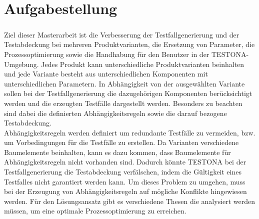 
\chapter{Aufgabestellung}\label{chp:aufgabenstellung}
\paragraph{}
%
%
%
%
%
%


Ziel dieser Masterarbeit ist die Verbesserung der Testfallgenerierung und der Testabdeckung bei mehreren Produktvarianten, die Ersetzung von Parameter, die Prozessoptimierung sowie die Handhabung für den Benutzer in der TESTONA-Umgebung. Jedes Produkt kann unterschiedliche Produktvarianten beinhalten und jede Variante besteht aus unterschiedlichen Komponenten mit unterschiedlichen Parametern. In Abhängigkeit von der ausgewählten Variante sollen bei der Testfallgenerierung die dazugehörigen Komponenten berücksichtigt werden und die erzeugten Testfälle dargestellt werden. Besonders zu beachten sind dabei die definierten Abhängigkeitsregeln sowie die darauf bezogene Testabdeckung.\\

Abhängigkeitsregeln werden definiert um redundante Testfälle zu vermeiden, bzw. um Vorbedingungen für die Testfälle zu erstellen. Da Varianten verschiedene Baumelemente beinhalten, kann es dazu kommen, dass Baumelemente für Abhängigkeitsregeln nicht vorhanden sind. Dadurch könnte TESTONA bei der Testfallgenerierung die Testabdeckung verfälschen, indem die Gültigkeit eines Testfalles nicht garantiert werden kann. Um dieses Problem zu umgehen, muss bei der Erzeugung von Abhängigkeitsregeln auf mögliche Konflikte hingewiesen werden. Für den Lösungsansatz gibt es verschiedene Thesen die analysiert werden müssen, um eine optimale Prozessoptimierung zu erreichen.\\

